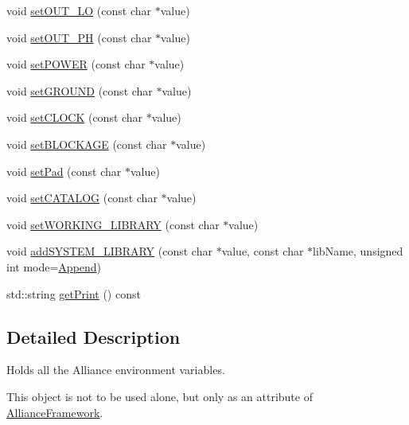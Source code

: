 \begin{DoxyCompactItemize}
\item 
void \mbox{\hyperlink{classCRL_1_1Environment_a57a42a469f6cf94ba39e5b7aacfa738c}{set\+O\+U\+T\+\_\+\+LO}} (const char $\ast$value)
\item 
void \mbox{\hyperlink{classCRL_1_1Environment_a2785f1ae18e4293ce7e9e0bac791e495}{set\+O\+U\+T\+\_\+\+PH}} (const char $\ast$value)
\item 
void \mbox{\hyperlink{classCRL_1_1Environment_ae96c850eadc89d1705b9aa0256f434ea}{set\+P\+O\+W\+ER}} (const char $\ast$value)
\item 
void \mbox{\hyperlink{classCRL_1_1Environment_ac956b6814f89975563a3667945599fb2}{set\+G\+R\+O\+U\+ND}} (const char $\ast$value)
\item 
void \mbox{\hyperlink{classCRL_1_1Environment_a7ddc44d7f27745179c397445bce35c58}{set\+C\+L\+O\+CK}} (const char $\ast$value)
\item 
void \mbox{\hyperlink{classCRL_1_1Environment_af18cbbcdfb458b69dbb6de0dbb564a3a}{set\+B\+L\+O\+C\+K\+A\+GE}} (const char $\ast$value)
\item 
void \mbox{\hyperlink{classCRL_1_1Environment_a06c179d70d3065f0bfe398a02e4c6359}{set\+Pad}} (const char $\ast$value)
\item 
void \mbox{\hyperlink{classCRL_1_1Environment_a02b727f207875cebefbb59842c1efe70}{set\+C\+A\+T\+A\+L\+OG}} (const char $\ast$value)
\item 
void \mbox{\hyperlink{classCRL_1_1Environment_a315f5a14de9dc354cf81728adb29a8c6}{set\+W\+O\+R\+K\+I\+N\+G\+\_\+\+L\+I\+B\+R\+A\+RY}} (const char $\ast$value)
\item 
void \mbox{\hyperlink{classCRL_1_1Environment_a7c3bff1fa3f9a080461950db36df4416}{add\+S\+Y\+S\+T\+E\+M\+\_\+\+L\+I\+B\+R\+A\+RY}} (const char $\ast$value, const char $\ast$lib\+Name, unsigned int mode=\mbox{\hyperlink{classCRL_1_1Environment_ac5692c2f5d20e892573a3d46de222aeba69ce578d2eeb6a8de507920ccf673b8d}{Append}})
\item 
std\+::string \mbox{\hyperlink{classCRL_1_1Environment_a9d55dc4dc591a1d3404af53b72ab7f8e}{get\+Print}} () const
\end{DoxyCompactItemize}


\subsection{Detailed Description}
Holds all the Alliance environment variables. 

This object is not to be used alone, but only as an attribute of \mbox{\hyperlink{classCRL_1_1AllianceFramework}{Alliance\+Framework}}.

